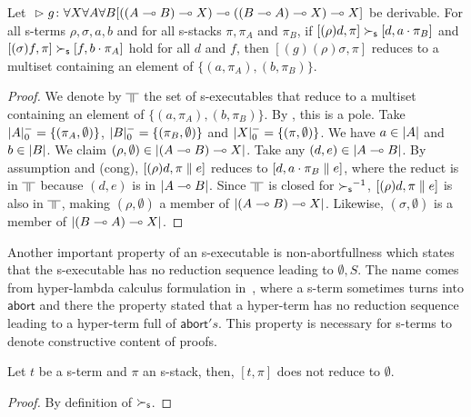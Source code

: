 \begin{proposition}
 \label{prop:spec}
 Let
 ${}\vartriangleright{}{ {g} \colon{\forall X\forall A\forall B
 [((A\multimap B)\multimap X)
  \multimap((B\multimap A)\multimap X)
  \multimap X]} }$
 be
 derivable.
 For all s-terms $\rho,\sigma, a,b$ and for all s-stacks $\pi, \pi_A$ and
 $\pi_B$,
 if $[(\rho)d  ,\pi]\succ_{\mathsf s} [d,a\cdot \pi_B]$ and
    $[(\sigma)f,\pi]\succ_{\mathsf s} [f,b\cdot \pi_A]$ hold for all $d$ and $f$,
 then
 $[(g)(\rho)\sigma,\pi]$ reduces to a multiset containing an
 element of
 $\{(a,\pi_A),(b,\pi_B)\}$.
\end{proposition}
\begin{proof}
 We denote by $\bbot$ the set of s-executables that reduce to a multiset
 containing an element of $\{(a,\pi_A), (b,\pi_B)\}$.
 By ,
 this is a pole.
 Take $|{A}|^-_0 =\{(\pi_A,\emptyset)\}$, $|{B}|^-_0 =
 \{(\pi_B,\emptyset)\}$ and $|{X}|^-_0=\{(\pi,\emptyset)\}$.
 We have $a\in|{A}|$ and $b\in|{B}|$.
 We claim $(\rho,\emptyset)\in|{(A\multimap B)\multimap X}|$.
 Take any $(d,e)\in|{A\multimap B}|$.
 By assumption and (cong),
 $[(\rho)d,\pi\parallel e]$ reduces to $[d,a\cdot\pi_B\parallel e]$,
 where the reduct is in $\bbot$ because $(d,e)$ is in $|{A\multimap B}|$.
 Since $\bbot$ is closed for ${\succ_{\mathsf s}}^{-1}$,
 $[(\rho)d,\pi\parallel e]$ is also in $\bbot$, making
 $(\rho,\emptyset)$ a member of $|{(A\multimap B)\multimap X}|$.
 Likewise,
 $(\sigma,\emptyset)$ is a member of $|{(B\multimap A)\multimap X}|$.
\end{proof}


Another important property of an s-executable is
non-abortfullness
which states that the s-executable has no reduction sequence leading to
$\emptyset,S$.
The name comes from hyper-lambda calculus formulation in~\citep{hiraiflops2012},
where a s-term sometimes turns into $\mathsf{abort}$ and there the property
stated that a hyper-term has no reduction sequence leading to a hyper-term
full of $\mathsf{abort}'s$.
This property is necessary for s-terms to denote
constructive content of proofs.

\begin{proposition}
 Let $t$ be a s-term and $\pi$ an s-stack, then,
 $[t,\pi]$ does not reduce to $\emptyset$.
\end{proposition}
\begin{proof}
 By definition of $\succ_{\mathsf s}$.
\end{proof}

